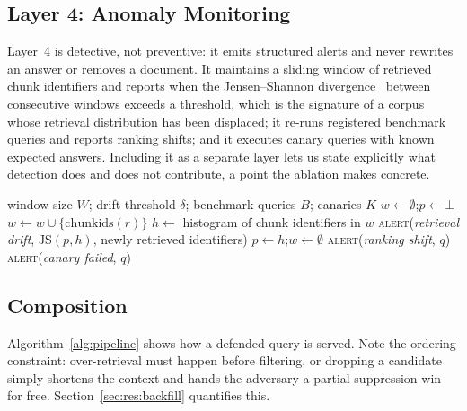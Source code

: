 \subsection{Layer 4: Anomaly Monitoring}
\label{sec:l4}

Layer~4 is detective, not preventive: it emits structured alerts and never rewrites an answer
or removes a document. It maintains a sliding window of retrieved chunk identifiers and reports
when the Jensen--Shannon divergence~\citep{lin1991divergence} between consecutive windows
exceeds a threshold, which is the signature of a corpus whose retrieval distribution has been
displaced; it re-runs registered benchmark queries and reports ranking shifts; and it executes
canary queries with known expected answers. Including it as a separate layer lets us state
explicitly what detection does and does not contribute, a point the ablation makes concrete.

\begin{algorithm}[H]
\caption{Layer 4: retrieval-drift monitoring}
\label{alg:l4}
\begin{algorithmic}[1]
\Require window size $W$; drift threshold $\delta$; benchmark queries $B$; canaries $K$
\State $w \gets \emptyset$;\quad $p \gets \bot$ 
  \State $w \gets w \cup \{\mathrm{chunkids}(r)\}$
     \State $h \gets$ histogram of chunk identifiers in $w$
        \State \textsc{alert}(\emph{retrieval drift}, $\mathrm{JS}(p,h)$, newly retrieved identifiers)
     \EndIf
     \State $p \gets h$;\quad $w \gets \emptyset$
  \EndIf
\EndFor
{} 
     \State \textsc{alert}(\emph{ranking shift}, $q$)
  \EndIf
\EndFor
{}
   \State \textsc{alert}(\emph{canary failed}, $q$) \EndIf
\EndFor
\end{algorithmic}
\end{algorithm}

\subsection{Composition}

Algorithm~\ref{alg:pipeline} shows how a defended query is served. Note the ordering
constraint: over-retrieval must happen before filtering, or dropping a candidate simply
shortens the context and hands the adversary a partial suppression win for free.
Section~\ref{sec:res:backfill} quantifies this.

